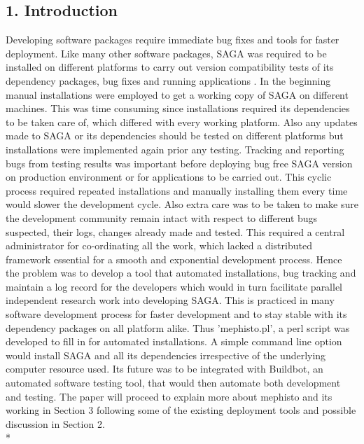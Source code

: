 \documentclass[a4paper,10pt]{article}
\begin{document}
\begin{multicols}{2}
\section*{\normalsize 1. Introduction}
Developing software packages require immediate bug fixes and tools for faster deployment. Like many other software packages, SAGA 
was required to be installed on different platforms to carry out version compatibility tests of its dependency packages, bug fixes and running applications . 
In the beginning manual installations were employed to get a working copy of SAGA on different machines. This was time consuming 
since installations required its dependencies to be taken care of, which differed with every working platform. Also any updates made to SAGA 
or its dependencies should be tested on different platforms but installations were implemented again prior any testing. Tracking and reporting 
bugs from testing results was important before deploying bug free SAGA version on production environment or for applications
to be carried out. This cyclic process required repeated installations and manually installing them every time would slower the development
cycle. Also extra care was to be taken to make sure the development community remain intact with respect to different bugs suspected,
their logs, changes already made and tested. This required a central administrator for co-ordinating all the work, which lacked
a distributed framework essential for a smooth and exponential development process. Hence the problem was to develop a tool that automated 
installations, bug tracking and maintain a log record for the developers which would in turn facilitate parallel independent research work into
developing SAGA. This is practiced in many software development process for faster development and to stay stable with its dependency 
packages on all platform alike. Thus 'mephisto.pl', a perl script was developed to fill in for automated installations.  
A simple command line option would install SAGA and all its dependencies irrespective of the underlying computer resource used. 
Its future was to be integrated with Buildbot, an automated software testing tool, that would then automate both development and testing. 
The paper will proceed to explain more about mephisto and its working in Section 3 following some of the existing deployment tools and possible 
discussion in Section 2. \\*

\end{multicols}
\end{document}
